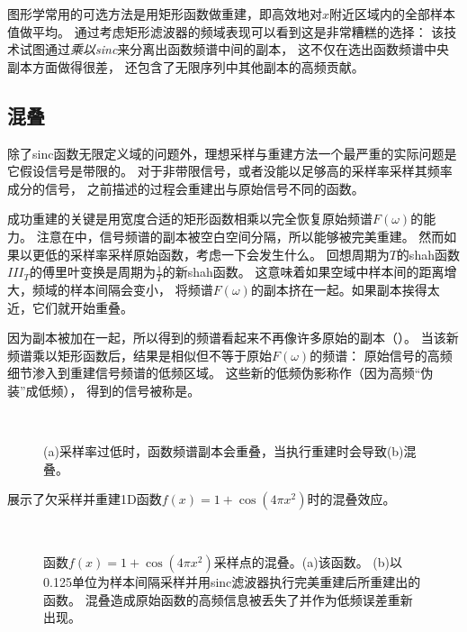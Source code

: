 图形学常用的可选方法是用矩形函数做重建，即高效地对$x$附近区域内的全部样本值做平均。
通过考虑矩形滤波器的频域表现可以看到这是非常糟糕的选择：
该技术试图通过\emph{乘以sinc}来分离出函数频谱中间的副本，
这不仅在选出函数频谱中央副本方面做得很差，
还包含了无限序列中其他副本的高频贡献。

\subsection{混叠}\label{sub:混叠}
除了sinc函数无限定义域的问题外，理想采样与重建方法一个最严重的实际问题是它假设信号是带限的。
对于非带限信号，或者没能以足够高的采样率采样其频率成分的信号，
之前描述的过程会重建出与原始信号不同的函数。

成功重建的关键是用宽度合适的矩形函数相乘以完全恢复原始频谱$F(\omega)$的能力。
注意在中，信号频谱的副本被空白空间分隔，所以能够被完美重建。
然而如果以更低的采样率采样原始函数，考虑一下会发生什么。
回想周期为$T$的shah函数$III_T$的傅里叶变换是周期为$\displaystyle\frac{1}{T}$的新shah函数。
这意味着如果空域中样本间的距离增大，频域的样本间隔会变小，
将频谱$F(\omega)$的副本挤在一起。如果副本挨得太近，它们就开始重叠。

因为副本被加在一起，所以得到的频谱看起来不再像许多原始的副本（）。
当该新频谱乘以矩形函数后，结果是相似但不等于原始$F(\omega)$的频谱：
原始信号的高频细节渗入到重建信号频谱的低频区域。
这些新的低频伪影称作（因为高频“伪装”成低频），
得到的信号被称是。
\begin{figure}
    \centering
    \,
    \caption{(a)采样率过低时，函数频谱副本会重叠，当执行重建时会导致(b)混叠。}
    \label{fig:7.8}
\end{figure}

展示了欠采样并重建1D函数$f(x)=1+\cos(4\pi x^2)$时的混叠效应。
\begin{figure}[htbp]
    \centering
    \,
    \caption{函数$f(x)=1+\cos(4\pi x^2)$采样点的混叠。(a)该函数。
        (b)以0.125单位为样本间隔采样并用sinc滤波器执行完美重建后所重建出的函数。
        混叠造成原始函数的高频信息被丢失了并作为低频误差重新出现。}
    \label{fig:7.9}
\end{figure}

